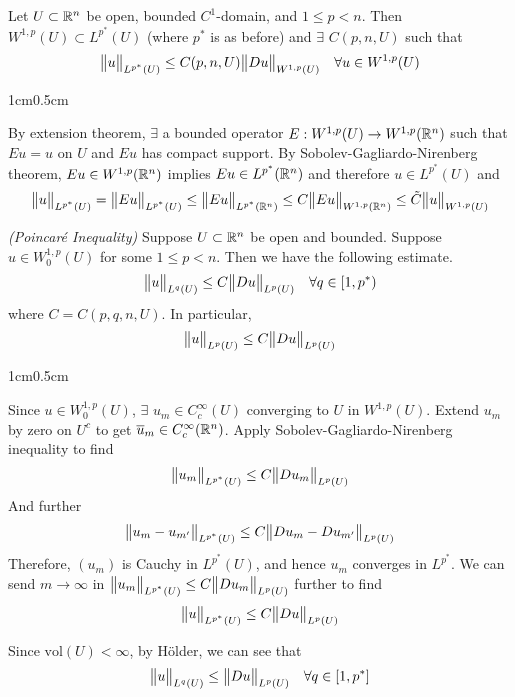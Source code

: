 \documentclass[10pt,a4paper]{report}
\newenvironment{proof}
{\begin{changemargin}{1cm}{0.5cm} 
	}%
	{\end{changemargin}
}
\begin{document}
 Let $U \subset \mathbb{R}^n$ be open, bounded $C^1$-domain, and $1\leq p<n$. Then $W^{1,p}(U) \subset L^{p^*}(U)$ (where $p^*$ is as before) and $\exists$ $C(p,n,U)$ such that
\begin{align*}
\bigl\lVert u\bigr\rVert_{L^{p^*}(U)} \leq C(p,n,U) \bigl\lVert Du\bigr\rVert_{W^{1,p} (U)} \quad \forall u \in W^{1,p}(U)
\end{align*} 
\begin{proof}
\pf By extension theorem, $\exists$ a bounded operator $E: W^{1,p}(U) \rightarrow W^{1,p}(\mathbb{R}^n)$ such that $Eu = u$ on $U$ and $Eu$ has compact support. By Sobolev-Gagliardo-Nirenberg theorem, $Eu \in W^{1,p}(\mathbb{R}^n)$ implies $Eu \in L^{p^*} (\mathbb{R}^n)$ and therefore $u \in L^{p^*}(U)$ and
\begin{align*}
\bigl\lVert u\bigr\rVert_{L^{p^*}(U)} = \bigl\lVert Eu\bigr\rVert_{L^{p^*}(U)} \leq \bigl\lVert Eu\bigr\rVert_{L^{p^*}(\mathbb{R}^n)} \leq C \bigl\lVert Eu\bigr\rVert_{W^{1,p}(\mathbb{R}^n)} \leq \tilde{C}\bigl\lVert u\bigr\rVert_{W^{1,p}(U)}
\end{align*}

\eop
\end{proof}
\s

 \emph{(Poincar\'{e} Inequality)} Suppose $U\subset \mathbb{R}^n$ be open and bounded. Suppose $u \in W_0^{1,p}(U)$ for some $1\leq p<n$. Then we have the following estimate.
\begin{align*}
\bigl\lVert u\bigr\rVert_{L^q (U)} \leq C\bigl\lVert Du\bigr\rVert_{L^p(U)} \quad \forall q \in [1,p^*)
\end{align*}
where $C = C(p,q,n,U)$. In particular,
\begin{align*}
\bigl\lVert u\bigr\rVert_{L^{p}(U)} \leq C \bigl\lVert Du\bigr\rVert_{L^p(U)}
\end{align*}
\begin{proof}
\pf Since $u \in W^{1,p}_0(U)$, $\exists$ $u_m \in C_c^{\infty}(U)$ converging to $U$ in $W^{1,p}(U)$. Extend $u_m$ by zero on $U^c$ to get $\overline{u}_m \in C^{\infty}_c (\mathbb{R}^n)$. Apply Sobolev-Gagliardo-Nirenberg inequality to find
\begin{align*}
\bigl\lVert u_m\bigr\rVert_{L^{p^*}(U)} \leq C \bigl\lVert Du_m\bigr\rVert_{L^p(U)}
\end{align*}
And further
\begin{align*}
\bigl\lVert u_m - u_{m'}\bigr\rVert_{L^{p^*}(U)} \leq C \bigl\lVert Du_m - Du_{m'}\bigr\rVert_{L^p(U)}
\end{align*}
Therefore, $(u_m)$ is Cauchy in $L^{p^*}(U)$, and hence $u_m$ converges in $L^{p^*}$. We can send $m\rightarrow \infty$ in $\bigl\lVert u_m\bigr\rVert_{L^{p^*}(U)} \leq C \bigl\lVert Du_m\bigr\rVert_{L^p(U)}$ further to find
\begin{align*}
\bigl\lVert u\bigr\rVert_{L^{p^*}(U)} \leq C \bigl\lVert Du\bigr\rVert_{L^p(U)}
\end{align*}

Since $\text{vol}(U) < \infty$, by H\"{o}lder, we can see that
\begin{align*}
\bigl\lVert u\bigr\rVert_{L^q(U)} \leq \bigl\lVert Du\bigr\rVert_{L^p(U)}  \quad \forall q \in [1,p^*]
\end{align*}
\eop
\end{proof}
\s
\end{document}
